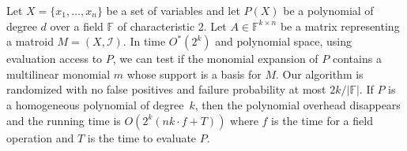 \documentclass{theoretics}
\newcommand{\F}{\ensuremath{\mathbb F}\xspace}
\newcommand{\cI}{\ensuremath{\mathcal I}\xspace}
\begin{document}
\begin{theorem} \label{theorem:sieve-basis}
  Let $X=\{x_1,\ldots,x_n\}$ be a set of variables and 
  let $P(X)$ be a polynomial of degree $d$ over a field $\F$ of characteristic 2.
  Let $A \in \F^{k \times n}$ be a matrix representing a matroid $M=(X, \cI)$. 
  In time $O^*(2^k)$ and polynomial space, using evaluation access to $P$, 
  we can test if the monomial expansion of $P$ contains a multilinear monomial
  $m$ whose support is a basis for $M$. Our algorithm is randomized with no false
  positives and failure probability at most $2k/|\F|$.
  If $P$ is a homogeneous polynomial of degree~$k$, then the polynomial overhead
  disappears and the running time is $O(2^k(nk\cdot f +T))$ where
  $f$ is the time for a field operation and $T$ is the time to
  evaluate $P$.
\end{theorem}
\end{document}
